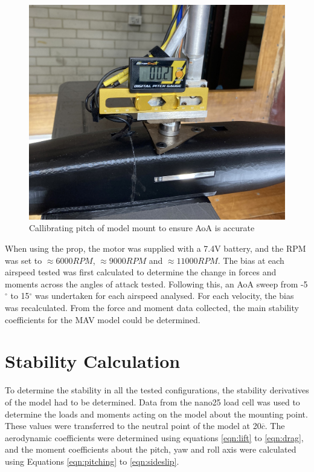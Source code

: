 \begin{figure}[H]
    \centering
    \includegraphics[scale=0.05]{04_Methodology/Figs/pitchGauge.jpg}
    \caption{Callibrating pitch of model mount to ensure \acrshort{AoA} is accurate}
    \label{fig:pitchGauge}
\end{figure}


When using the prop, the motor was supplied with a 7.4V battery, and the RPM was set to $\approx 6000 RPM$, $\approx 9000RPM$ and $\approx 11000 RPM$. The bias at each airspeed tested was first calculated to determine the change in forces and moments across the angles of attack tested. Following this, an \acrshort{AoA} sweep from -5$^{\circ}$ to 15$^{\circ}$ was undertaken for each airspeed analysed. For each velocity, the bias was recalculated. From the force and moment data collected, the main stability coefficients for the \acrshort{MAV} model could be determined.


\section{Stability Calculation}
To determine the stability in all the tested configurations, the stability derivatives of the model had to be determined. Data from the nano25 load cell was used to determine the loads and moments acting on the model about the mounting point. These values were transferred to the neutral point of the model at 20$\overline{c}$. The aerodynamic coefficients were determined using equations \ref{eqn:lift} to \ref{eqn:drag}, and the moment coefficients about the pitch, yaw and roll axis were calculated using Equations \ref{eqn:pitching} to \ref{eqn:sideslip}. 


